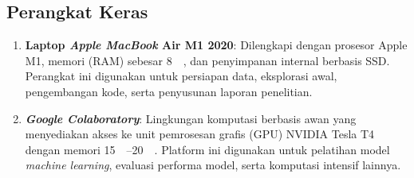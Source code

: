 \subsection{Perangkat Keras}
\begin{enumerate}
  \item \textbf{Laptop \textit{Apple MacBook} Air M1 2020}: Dilengkapi dengan prosesor Apple M1, memori (RAM) sebesar \SI{8}{\giga\byte}, dan penyimpanan internal berbasis SSD. Perangkat ini digunakan untuk persiapan data, eksplorasi awal, pengembangan kode, serta penyusunan laporan penelitian.
  \item \textbf{\textit{Google Colaboratory}}: Lingkungan komputasi berbasis awan yang menyediakan akses ke unit pemrosesan grafis (GPU) NVIDIA Tesla T4 dengan memori \SIrange{15}{20}{\giga\byte}. Platform ini digunakan untuk pelatihan model \textit{machine learning}, evaluasi performa model, serta komputasi intensif lainnya.
\end{enumerate}

